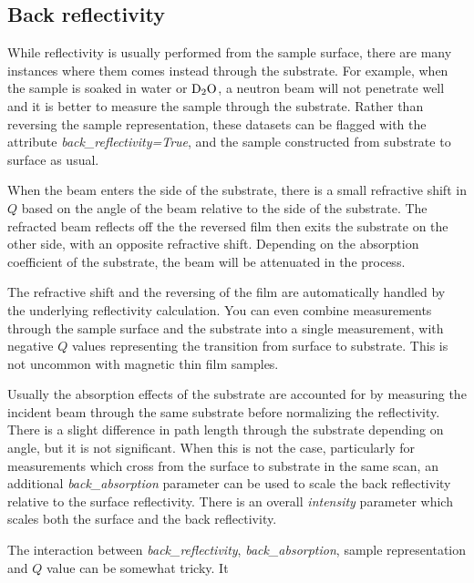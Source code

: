 \documentclass[letterpaper,10pt,english]{sphinxmanual}
\begin{document}
\subsection{Back reflectivity}
\label{guide/data:back-reflectivity}\label{guide/data:data-backrefl}
While reflectivity is usually performed from the sample surface,
there are many instances where them comes instead through the
substrate.  For example, when the sample is soaked in water or
${\rm D}_2{\rm O}$, a neutron beam will not penetrate well and
it is better to measure the sample through the substrate.  Rather
than reversing the sample representation, these datasets can
be flagged with the attribute \emph{back\_reflectivity=True}, and the
sample constructed from substrate to surface as usual.

When the beam enters the side of the substrate, there is a
small refractive shift in $Q$ based on the angle of the beam relative
to the side of the substrate. The refracted beam reflects off the
the reversed film then exits the substrate on the other side, with an
opposite refractive shift.  Depending on the absorption coefficient
of the substrate, the beam will be attenuated in the process.

The refractive shift and the reversing of the film are automatically
handled by the underlying reflectivity calculation.  You can even
combine measurements through the sample surface and the substrate
into a single measurement, with negative $Q$ values representing
the transition from surface to substrate.  This is not uncommon with
magnetic thin film samples.

Usually the absorption effects of the substrate are accounted for
by measuring the incident beam through the same substrate before
normalizing the reflectivity.  There is a slight difference in path
length through the substrate depending on angle, but it is not
significant.  When this is not the case, particularly for measurements
which cross from the surface to substrate in the same scan, an
additional \emph{back\_absorption} parameter can be used to scale the
back reflectivity relative to the surface reflectivity.  There
is an overall \emph{intensity} parameter which scales both the surface
and the back reflectivity.

The interaction between \emph{back\_reflectivity}, \emph{back\_absorption},
sample representation and $Q$ value can be somewhat tricky.  It
\end{document}
